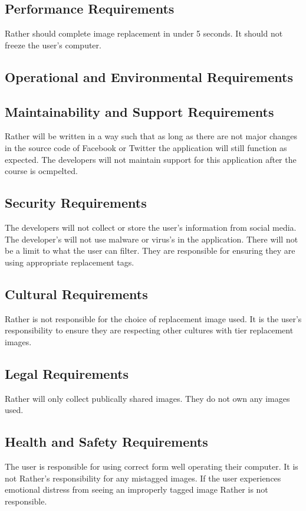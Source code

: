 \documentclass[12pt, titlepage]{article}
\begin{document}
\subsection{Performance Requirements}
Rather should complete image replacement in under 5 seconds. It should not freeze the user's computer. 
\subsection{Operational and Environmental Requirements}

\subsection{Maintainability and Support Requirements}
Rather will be written in a way such that as long as there are not major changes in the source code of Facebook or Twitter the application will still function as expected. The developers will not maintain support for this application after the course is ocmpelted.

\subsection{Security Requirements}
The developers will not collect or store the user's information from social media. The developer's will not use malware or virus's in the application. There will not be a limit to what the user can filter. They are responsible for ensuring they are using appropriate replacement tags. 

\subsection{Cultural Requirements}
Rather is not responsible for the choice of replacement image used. It is the user's responsibility to ensure they are respecting other cultures with tier replacement images.

\subsection{Legal Requirements}
Rather will only collect publically shared images. They do not own any images used. 

\subsection{Health and Safety Requirements}
The user is responsible for using correct form well operating their computer. It is not Rather's responsibility for any mistagged images. If the user experiences emotional distress from seeing an improperly tagged image Rather is not responsible. 
\end{document}
